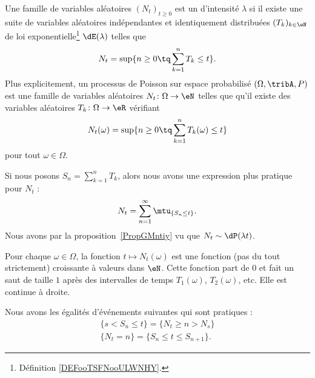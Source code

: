 
\begin{definition}      \label{DEFooWXHEooEHQUJU}       
    Une famille de variables aléatoires \( (N_t)_{t\geq 0}\) est un  d'intensité \( \lambda\) si il existe une suite de variables aléatoires indépendantes et identiquement distribuées \( (T_k)_{k\in \eN}\) de loi exponentielle\footnote{Définition \ref{DEFooTSFNooULWNHY}.} \( \dE(\lambda)\) telles que
	\begin{equation}
		N_t=\sup\{ n\geq 0\tq \sum_{k=1}^nT_k\leq t \}.
	\end{equation}
    Plus explicitement, un processus de Poisson sur espace probabilisé \( (\Omega,\tribA,P)\) est une famille de variables aléatoires \( N_t\colon \Omega\to \eN\) telles que qu'il existe des variables aléatoires \( T_k\colon \Omega\to \eR\) vérifiant
    \begin{equation}
        N_t(\omega)=\sup\{ n\geq 0\tq \sum_{k=1}^nT_k(\omega)\leq t \}
    \end{equation}
    pour tout \( \omega\in\Omega\).
\end{definition}
Si nous posons \( S_n=\sum_{k=1}^nT_k\), alors nous avons une expression plus pratique pour \( N_t\) :
\begin{equation}
	N_t=\sum_{n=1}^{\infty}\mtu_{\{ S_n\leq t \}}.
\end{equation}
Nous avons par la proposition~\ref{PropGMntiy} vu que \( N_t\sim\dP(\lambda t)\).


Pour chaque \( \omega\in \Omega\), la fonction \( t\mapsto N_t(\omega)\) est une fonction (pas du tout strictement) croissante à valeurs dans \( \eN\). Cette fonction part de \( 0\) et fait un saut de taille \( 1\) après des intervalles de temps \( T_1(\omega)\), \( T_2(\omega)\), etc. Elle est continue à droite.

Nous avons les égalités d'événements suivantes qui sont pratiques :
\begin{subequations}
	\begin{align}
		\{ s<S_n\leq t \}=\{ N_t\geq n>N_s \} \\
		\{ N_t=n \}=\{ S_n\leq t\leq S_{n+1} \}.
	\end{align}
\end{subequations}

